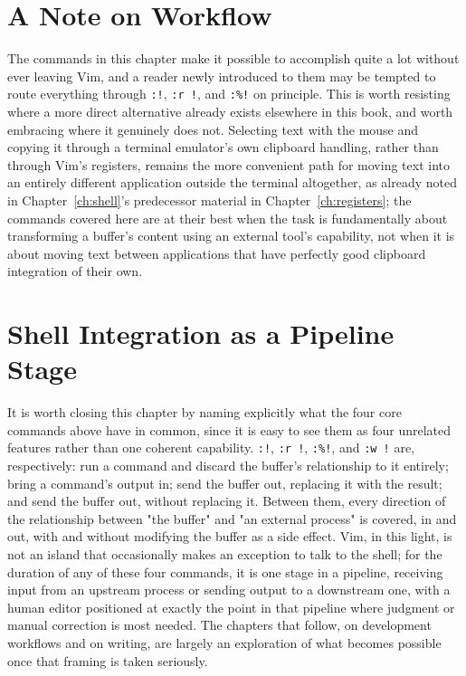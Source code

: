 \section{A Note on Workflow}

The commands in this chapter make it possible to accomplish quite a lot without ever leaving Vim, and a reader newly introduced to them may be tempted to route everything through \texttt{:!}, \texttt{:r !}, and \texttt{:\%!} on principle. This is worth resisting where a more direct alternative already exists elsewhere in this book, and worth embracing where it genuinely does not. Selecting text with the mouse and copying it through a terminal emulator's own clipboard handling, rather than through Vim's registers, remains the more convenient path for moving text into an entirely different application outside the terminal altogether, as already noted in Chapter~\ref{ch:shell}'s predecessor material in Chapter~\ref{ch:registers}; the commands covered here are at their best when the task is fundamentally about transforming a buffer's content using an external tool's capability, not when it is about moving text between applications that have perfectly good clipboard integration of their own.

\section{Shell Integration as a Pipeline Stage}

It is worth closing this chapter by naming explicitly what the four core commands above have in common, since it is easy to see them as four unrelated features rather than one coherent capability. \texttt{:!}, \texttt{:r !}, \texttt{:\%!}, and \texttt{:w !} are, respectively: run a command and discard the buffer's relationship to it entirely; bring a command's output in; send the buffer out, replacing it with the result; and send the buffer out, without replacing it. Between them, every direction of the relationship between "the buffer" and "an external process" is covered, in and out, with and without modifying the buffer as a side effect. Vim, in this light, is not an island that occasionally makes an exception to talk to the shell; for the duration of any of these four commands, it is one stage in a pipeline, receiving input from an upstream process or sending output to a downstream one, with a human editor positioned at exactly the point in that pipeline where judgment or manual correction is most needed. The chapters that follow, on development workflows and on writing, are largely an exploration of what becomes possible once that framing is taken seriously.
